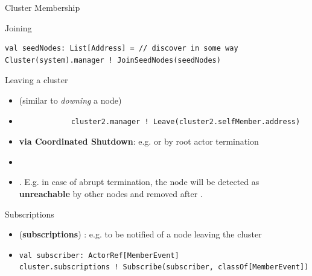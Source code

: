 \documentclass[presentation, 9pt]{beamer}\mode<presentation>{\usetheme{AMSBolognaFC}}
\begin{document}
\begin{frame}{Cluster Membership}
\begin{alertblock}{Joining}
\begin{enumerate}
\begin{tcolorbox}[left=0pt, top=0pt, bottom=0pt]
				\begin{verbatim}
val seedNodes: List[Address] = // discover in some way
Cluster(system).manager ! JoinSeedNodes(seedNodes)
				\end{verbatim}
			\end{tcolorbox}
		\end{enumerate}
	\end{alertblock}
	\begin{alertblock}{Leaving a cluster}
		\begin{itemize}
			\item {} (similar to \emph{downing} a node)
			\item[]
			\begin{tcolorbox}[left=0pt, top=0pt, bottom=0pt]
				\begin{verbatim}
			cluster2.manager ! Leave(cluster2.selfMember.address)
		\end{verbatim}
	\end{tcolorbox}
	\item {} \textbf{via Coordinated Shutdown}: e.g.  or by root actor
	termination
	\item {}
 \item {}. E.g. in case of abrupt termination, the node will be detected as
 \textbf{unreachable} by other nodes and removed after .
		\end{itemize}
	\end{alertblock}

	\begin{alertblock}{Subscriptions}
			\begin{itemize}
					\item {} (\textbf{subscriptions}) \href{https://doc.akka.io/docs/akka/current/typed/cluster.html#joining-and-leaving-a-cluster}{\faLink}: e.g. to be notified of a node leaving the
					cluster
					\item[] \begin{tcolorbox}[left=0pt, top=0pt, bottom=0pt]
						\begin{verbatim}
val subscriber: ActorRef[MemberEvent]
cluster.subscriptions ! Subscribe(subscriber, classOf[MemberEvent])
					\end{verbatim}
					\end{tcolorbox}
			\end{itemize}
	\end{alertblock}
\end{frame}
\end{document}
